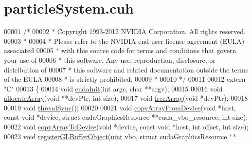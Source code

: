 \hypertarget{particle_system_8cuh_source}{\section{particle\-System.\-cuh}
}

\begin{DoxyCode}
00001 \textcolor{comment}{/*}
00002 \textcolor{comment}{ * Copyright 1993-2012 NVIDIA Corporation.  All rights reserved.}
00003 \textcolor{comment}{ *}
00004 \textcolor{comment}{ * Please refer to the NVIDIA end user license agreement (EULA) associated}
00005 \textcolor{comment}{ * with this source code for terms and conditions that govern your use of}
00006 \textcolor{comment}{ * this software. Any use, reproduction, disclosure, or distribution of}
00007 \textcolor{comment}{ * this software and related documentation outside the terms of the EULA}
00008 \textcolor{comment}{ * is strictly prohibited.}
00009 \textcolor{comment}{ *}
00010 \textcolor{comment}{ */}
00011 
00012 \textcolor{keyword}{extern} \textcolor{stringliteral}{"C"}
00013 \{
00014     \textcolor{keywordtype}{void} \hyperlink{particle_system_8cuh_ad205012a960928f6fb61ea4f51a95e9f}{cudaInit}(\textcolor{keywordtype}{int} argc, \textcolor{keywordtype}{char} **argv);
00015 
00016     \textcolor{keywordtype}{void} \hyperlink{particle_system_8cuh_aee51e01a5233e0fda578bd5b3bc38e8f}{allocateArray}(\textcolor{keywordtype}{void} **devPtr, \textcolor{keywordtype}{int} size);
00017     \textcolor{keywordtype}{void} \hyperlink{particle_system_8cuh_a2946519c8d9c4f8ebf552bf044821ea9}{freeArray}(\textcolor{keywordtype}{void} *devPtr);
00018 
00019     \textcolor{keywordtype}{void} \hyperlink{particle_system_8cuh_af59f4c114812beed29874c0a1a31519d}{threadSync}();
00020 
00021     \textcolor{keywordtype}{void} \hyperlink{particle_system_8cuh_a54716407dbd516db34f42b2faf7f91a3}{copyArrayFromDevice}(\textcolor{keywordtype}{void} *host, \textcolor{keyword}{const} \textcolor{keywordtype}{void} *device, \textcolor{keyword}{struct} 
      cudaGraphicsResource **cuda\_vbo\_resource, \textcolor{keywordtype}{int} size);
00022     \textcolor{keywordtype}{void} \hyperlink{particle_system_8cuh_ac4d4ecd921dbed6c2deef639ca295374}{copyArrayToDevice}(\textcolor{keywordtype}{void} *device, \textcolor{keyword}{const} \textcolor{keywordtype}{void} *host, \textcolor{keywordtype}{int} offset, \textcolor{keywordtype}{int} size);
00023     \textcolor{keywordtype}{void} \hyperlink{particle_system_8cuh_a4386a84282ceeaba09939817aa2a9c24}{registerGLBufferObject}(\hyperlink{particles__kernel_8cuh_a91ad9478d81a7aaf2593e8d9c3d06a14}{uint} vbo, \textcolor{keyword}{struct} cudaGraphicsResource **

\end{DoxyCode}
